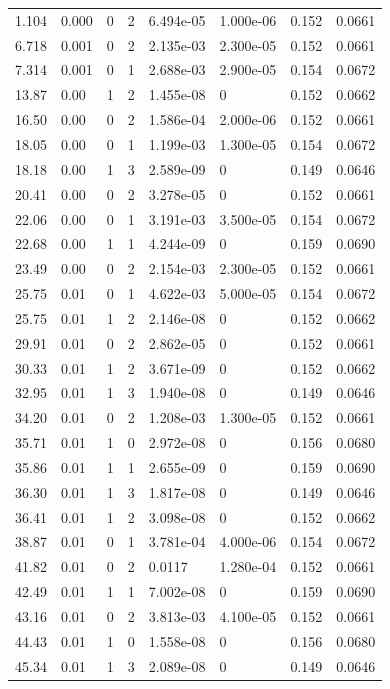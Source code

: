 \documentclass[preview]{standalone}
\begin{document}
{{\begin{tabular}{L{1.2cm}C{1.2cm} C{0.3cm}C{0.5cm} C{1.4cm}C{1.4cm} C{1.4cm}C{1.4cm}}
  1.104  &  0.000  & 0     &  2 &  6.494e-05  & 1.000e-06  & 0.152 &  0.0661   \\ 
  6.718  &  0.001  & 0     &  2 &  2.135e-03  & 2.300e-05  & 0.152 &  0.0661   \\ 
  7.314  &  0.001  & 0     &  1 &  2.688e-03  & 2.900e-05  & 0.154 &  0.0672   \\ 
  13.87  &  0.00  & 1     &  2 &  1.455e-08  & 0  & 0.152 &  0.0662   \\ 
  16.50  &  0.00  & 0     &  2 &  1.586e-04  & 2.000e-06  & 0.152 &  0.0661   \\ 
  18.05  &  0.00  & 0     &  1 &  1.199e-03  & 1.300e-05  & 0.154 &  0.0672   \\ 
  18.18  &  0.00  & 1     &  3 &  2.589e-09  & 0  & 0.149 &  0.0646   \\ 
  20.41  &  0.00  & 0     &  2 &  3.278e-05  & 0  & 0.152 &  0.0661   \\ 
  22.06  &  0.00  & 0     &  1 &  3.191e-03  & 3.500e-05  & 0.154 &  0.0672   \\ 
  22.68  &  0.00  & 1     &  1 &  4.244e-09  & 0  & 0.159 &  0.0690   \\ 
  23.49  &  0.00  & 0     &  2 &  2.154e-03  & 2.300e-05  & 0.152 &  0.0661   \\ 
  25.75  &  0.01  & 0     &  1 &  4.622e-03  & 5.000e-05  & 0.154 &  0.0672   \\ 
  25.75  &  0.01  & 1     &  2 &  2.146e-08  & 0  & 0.152 &  0.0662   \\ 
  29.91  &  0.01  & 0     &  2 &  2.862e-05  & 0  & 0.152 &  0.0661   \\ 
  30.33  &  0.01  & 1     &  2 &  3.671e-09  & 0  & 0.152 &  0.0662   \\ 
  32.95  &  0.01  & 1     &  3 &  1.940e-08  & 0  & 0.149 &  0.0646   \\ 
  34.20  &  0.01  & 0     &  2 &  1.208e-03  & 1.300e-05  & 0.152 &  0.0661   \\ 
  35.71  &  0.01  & 1     &  0 &  2.972e-08  & 0  & 0.156 &  0.0680   \\ 
  35.86  &  0.01  & 1     &  1 &  2.655e-09  & 0  & 0.159 &  0.0690   \\ 
  36.30  &  0.01  & 1     &  3 &  1.817e-08  & 0  & 0.149 &  0.0646   \\ 
  36.41  &  0.01  & 1     &  2 &  3.098e-08  & 0  & 0.152 &  0.0662   \\ 
  38.87  &  0.01  & 0     &  1 &  3.781e-04  & 4.000e-06  & 0.154 &  0.0672   \\ 
  41.82  &  0.01  & 0     &  2 &  0.0117  & 1.280e-04  & 0.152 &  0.0661   \\ 
  42.49  &  0.01  & 1     &  1 &  7.002e-08  & 0  & 0.159 &  0.0690   \\ 
  43.16  &  0.01  & 0     &  2 &  3.813e-03  & 4.100e-05  & 0.152 &  0.0661   \\ 
  44.43  &  0.01  & 1     &  0 &  1.558e-08  & 0  & 0.156 &  0.0680   \\ 
  45.34  &  0.01  & 1     &  3 &  2.089e-08  & 0  & 0.149 &  0.0646   \\ 
\hline 
\end{tabular} 

}}
\end{document}
